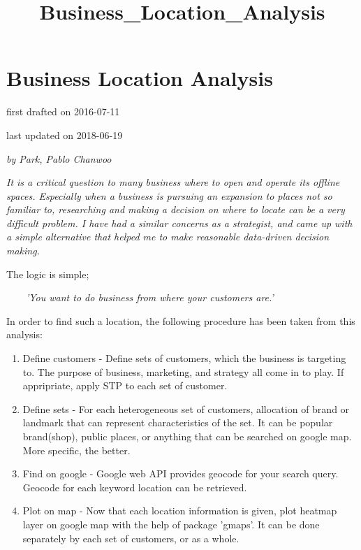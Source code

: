 \documentclass[11pt]{article}
\title{Business\_Location\_Analysis}
\providecommand{\tightlist}{%
      \setlength{\itemsep}{0pt}\setlength{\parskip}{0pt}}
\begin{document}
    
    
    \maketitle
    
    

    
    \section{Business Location Analysis}\label{business-location-analysis}

    first drafted on 2016-07-11

last updated on 2018-06-19

\emph{by Park, Pablo Chanwoo}

    \emph{It is a critical question to many business where to open and
operate its offline spaces. Especially when a business is pursuing an
expansion to places not so familiar to, researching and making a
decision on where to locate can be a very difficult problem. I have had
a similar concerns as a strategist, and came up with a simple
alternative that helped me to make reasonable data-driven decision
making.}

    The logic is simple;

 ~~~~\emph{'You want to do business from where your customers are.'}

 In order to find such a location, the following procedure has been
taken from this analysis:

\begin{enumerate}
\def\labelenumi{\arabic{enumi}.}
\tightlist
\item
  Define customers - Define sets of customers, which the business is
  targeting to. The purpose of business, marketing, and strategy all
  come in to play. If appripriate, apply STP to each set of customer.
\item
  Define sets - For each heterogeneous set of customers, allocation of
  brand or landmark that can represent characteristics of the set. It
  can be popular brand(shop), public places, or anything that can be
  searched on google map. More specific, the better.
\item
  Find on google - Google web API provides geocode for your search
  query. Geocode for each keyword location can be retrieved.
\item
  Plot on map - Now that each location information is given, plot
  heatmap layer on google map with the help of package 'gmaps'. It can
  be done separately by each set of customers, or as a whole.
\end{enumerate}
\end{document}

